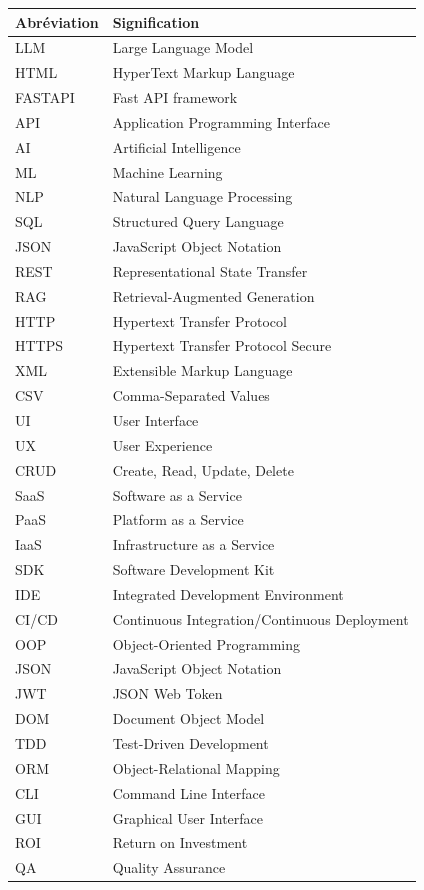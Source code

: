 \documentclass[a4paper, 11pt, openany]{report}
\begin{document}
\begin{tabular}{ll}
\textbf{Abréviation} & \textbf{Signification} \\
\hline
LLM & Large Language Model \\
HTML & HyperText Markup Language \\
FASTAPI & Fast API framework \\
API & Application Programming Interface \\
AI & Artificial Intelligence \\
ML & Machine Learning \\
NLP & Natural Language Processing \\
SQL & Structured Query Language \\
JSON & JavaScript Object Notation \\
REST & Representational State Transfer \\
RAG & Retrieval-Augmented Generation \\
HTTP & Hypertext Transfer Protocol \\
HTTPS & Hypertext Transfer Protocol Secure \\
XML & Extensible Markup Language \\
CSV & Comma-Separated Values \\
UI & User Interface \\
UX & User Experience \\
CRUD & Create, Read, Update, Delete \\
SaaS & Software as a Service \\
PaaS & Platform as a Service \\
IaaS & Infrastructure as a Service \\
SDK & Software Development Kit \\
IDE & Integrated Development Environment \\
CI/CD & Continuous Integration/Continuous Deployment \\
OOP & Object-Oriented Programming \\
JSON & JavaScript Object Notation \\
JWT & JSON Web Token \\
DOM & Document Object Model \\
TDD & Test-Driven Development \\
ORM & Object-Relational Mapping \\
CLI & Command Line Interface \\
GUI & Graphical User Interface \\
ROI & Return on Investment \\
QA & Quality Assurance \\
\end{tabular}
\end{document}
